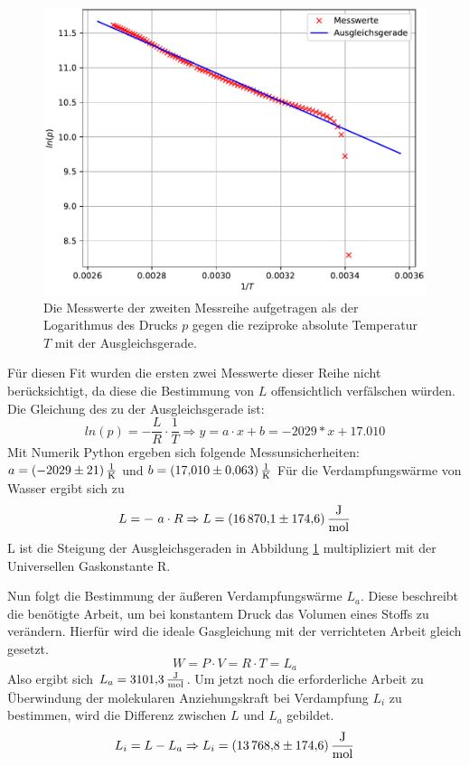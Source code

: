 \begin{figure}[H]
  \centering
  \includegraphics[scale=0.5]{python/plotc.pdf}
  \caption{Die Messwerte der zweiten Messreihe aufgetragen als der Logarithmus des Drucks $p$
  gegen die reziproke absolute Temperatur $T$ mit der Ausgleichsgerade.}
  \label{fig:Ausgleichsgerade}
\end{figure}
Für diesen Fit wurden die ersten zwei Messwerte dieser Reihe nicht berücksichtigt, da diese die Bestimmung von $L$
offensichtlich verfälschen würden.
Die Gleichung des zu der Ausgleichsgerade ist:
\begin{equation}
  ln(p) = - \frac{L}{R} \cdot \frac{1}{T}
  \Rightarrow y = a \cdot x + b = -2029 * x + 17.010
\end{equation}
Mit Numerik Python ergeben sich folgende Messunsicherheiten: $a = \SI{-2029 \pm 21 }{\frac{1}{\kelvin}}$
und $b = \SI{17.010 \pm 0.063}{\frac{1}{\kelvin}}$
Für die Verdampfungswärme von Wasser ergibt sich zu
\begin{equation*}
  L = - \ a \cdot R \Rightarrow L = \SI{16870.1 \pm 174.6}{\frac{\J}{\mol}}
\end{equation*}
L ist die Steigung der Ausgleichsgeraden in Abbildung \ref{fig:Ausgleichsgerade} multipliziert mit der Universellen Gaskonstante R.

Nun folgt die Bestimmung der äußeren Verdampfungswärme $L_a$.
Diese beschreibt die benötigte Arbeit, um bei konstantem Druck das Volumen eines Stoffs zu verändern.
Hierfür wird die ideale Gasgleichung mit der verrichteten Arbeit gleich gesetzt.
\begin{equation}
    W = P \cdot V = R \cdot T = L_a
\end{equation}
Also ergibt sich $L_a = \SI{3101.3}{\frac{\J}{\mol}}$.
Um jetzt noch die erforderliche Arbeit zu Überwindung der molekularen Anziehungskraft bei Verdampfung $L_i$ zu bestimmen, wird
    die Differenz zwischen $L$ und $L_a$ gebildet.
\begin{equation}
    L_i = L - L_a \Rightarrow L_i = \SI{13768.8 \pm 174.6}{\frac{\J}{\mol}}
\end{equation}

